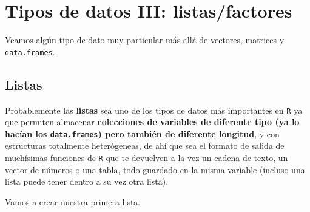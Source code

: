 \documentclass[11pt,]{book}
\begin{document}
\hypertarget{otros_datos}{%
\chapter{Tipos de datos III: listas/factores}\label{otros_datos}}

Veamos algún tipo de dato muy particular más allá de vectores, matrices y \texttt{data.frames}.

\hypertarget{listas}{%
\section{Listas}\label{listas}}

Probablemente las \textbf{listas} sea uno de los tipos de datos más importantes en \texttt{R} ya que permiten almacenar \textbf{colecciones de variables de diferente tipo (ya lo hacían los \texttt{data.frames}) pero también de diferente longitud}, y con estructuras totalmente heterógeneas, de ahí que sea el formato de salida de muchísimas funciones de \texttt{R} que te devuelven a la vez un cadena de texto, un vector de números o una tabla, todo guardado en la misma variable (incluso una lista puede tener dentro a su vez otra lista).

Vamos a crear nuestra primera lista.
\end{document}
